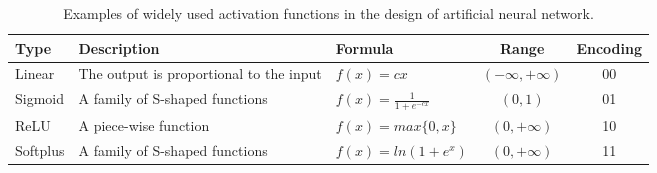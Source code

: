 \begin{table*}[!t]
\centering
\caption{Examples of widely used activation functions in the design of artificial neural network.}
\label{tab:active_function}
\begin{adjustbox}{width=0.9\textwidth}
\label{tab:transfer_function}
	\begin{tabular}{lllcc}
			\toprule
			Type & Description  & Formula & Range              & Encoding\\
			\midrule
			Linear   & The output is proportional to the input & $f(x)=cx$                  &  $(-\infty, +\infty)$ & 00\\
			Sigmoid  & A family of S-shaped functions          & $f(x)=\frac{1}{1+e^{-cx}}$ & $(0, 1)$              & 01\\
			ReLU     & A piece-wise function                   & $f(x)= max\{0,x\}$           & $(0, +\infty)$        & 10\\
			Softplus & A family of S-shaped functions          & $f(x) = ln(1+e^x)$         & $(0, +\infty)$        & 11\\
			\bottomrule
	\end{tabular}
\end{adjustbox}
\end{table*}
